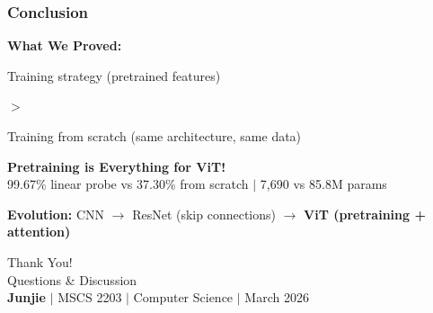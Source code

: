 \documentclass[aspectratio=169]{beamer}
\begin{document}
\begin{frame}
    \frametitle{Conclusion}

    \begin{center}
        \Large
        \textbf{What We Proved:}

        \vspace{0.2cm}

        \normalsize
        Training strategy (pretrained features)

        \LARGE $>$

        \normalsize
        Training from scratch (same architecture, same data)

        \vspace{0.5cm}

        \begin{block}{}
            \centering
            \textbf{Pretraining is Everything for ViT!}\\
            \vspace{0.1cm}
            99.67\% linear probe vs 37.30\% from scratch $\vert$ 7,690 vs 85.8M params
        \end{block}

        \vspace{0.15cm}

        \small
        \textbf{Evolution:} CNN $\rightarrow$ ResNet (skip connections) $\rightarrow$ \textbf{ViT (pretraining + attention)}

        \vspace{0.3cm}

        {\Huge Thank You!}\\[0.15cm]
        {\Large Questions \& Discussion}\\[0.15cm]
        \footnotesize
        \textbf{Junjie} $\vert$ MSCS 2203 $\vert$ Computer Science $\vert$ March 2026
    \end{center}
\end{frame}
\end{document}
